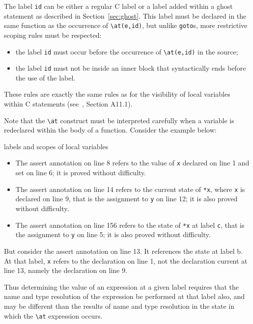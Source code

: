 The label \lstinline|id| can be either a regular C label or a label added
within a ghost statement as described in Section~\ref{sec:ghost}. This
label must be declared in the same function as the occurrence of
\lstinline|\at(e,id)|, but unlike \lstinline|goto|s, more restrictive
scoping rules must be respected:
\begin{itemize}
\item the label \lstinline|id| must occur before the occurrence of
\lstinline|\at(e,id)|
  in the source;
\item the label \lstinline|id| must not be inside an inner block that syntactically ends before the use of the label.
\end{itemize}
These rules are exactly the same rules as for the visibility of local
variables within C statements (see~\cite{KR88}, Section A11.1).

Note that the \lstinline|\at| construct must be interpreted carefully when a variable is redeclared within the body of a function.
Consider the example below:
\begin{example}{labels and scopes of local variables}
\label{redeclaration}

\end{example}
\begin{itemize}
\item The assert annotation on line 8 refers to the value of \lstinline|x| declared on line 1 and set on line 6; it is proved without difficulty.
\item The assert annotation on line 14 refers to the current state of \lstinline|*x|, where \lstinline|x| is declared on line 9, that is the assignment to \lstinline|y| on line 12; it is also proved without difficulty.
\item The assert annotation on line 156 refers to the state of \lstinline|*x| at label \lstinline|c|, that is the assignment to \lstinline|y| on line 5; it is also proved without difficulty.
\end{itemize}
But consider the assert annotation on line 13. It references the state at label b. At that label, \lstinline|x| refers to the declaration on line 1, not the declaration current at line 13, namely the declaration on line 9.

Thus determining the value of an expression at a given label requires that the name and type resolution of the expression be performed at that label also, and may be different than the results of name and type resolution in the state in which the \lstinline|\at| expression occurs.

